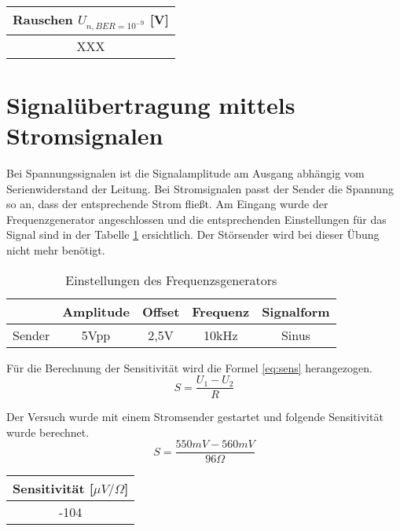 \begin{table}[!h]
	\centering
	\begin{tabular}{|c|}
		\hline 
		Rauschen $U_{n, BER = 10^{-9}}$ [V]		\\ 
		\hline 
		XXX		\\ 
		\hline 
	\end{tabular}
\end{table}



\section{Signalübertragung mittels Stromsignalen}
Bei Spannungssignalen ist die Signalamplitude am Ausgang abhängig vom Serienwiderstand der Leitung. Bei Stromsignalen passt der Sender die Spannung so an, dass der entsprechende Strom fließt. Am Eingang wurde der Frequenzgenerator angeschlossen und die entsprechenden Einstellungen für das Signal sind in der Tabelle \ref{tb:einst_strom} ersichtlich. Der Störsender wird bei dieser Übung nicht mehr benötigt.

\begin{table}[!h]
	\centering
	\begin{tabular}{|c|c|c|c|c|}
	\hline 
			& Amplitude		& Offset 	& Frequenz 		& Signalform		\\ 
	\hline 
	Sender	& 5Vpp		& 2,5V	& 10kHz		& Sinus		\\ 
	\hline 
	\end{tabular}
	\caption{Einstellungen des Frequenzsgenerators}
	\label{tb:einst_strom}
\end{table}

Für die Berechnung der Sensitivität wird die Formel \ref{eq:sens} herangezogen.
\begin{equation}
	S = \dfrac{U_1 - U_2}{R}
	\label{eq:sens}
\end{equation}

Der Versuch wurde mit einem Stromsender gestartet und folgende Sensitivität wurde berechnet.
\begin{equation}
	S = \dfrac{550mV - 560mV}{96\Omega}
	\label{eq:sens}
\end{equation}

\begin{table}[!h]
	\centering
	\begin{tabular}{|c|}
		\hline 
		Sensitivität [$\mu V / \Omega$]		\\ 
		\hline 
		-104		\\ 
		\hline 
	\end{tabular}
\end{table}


